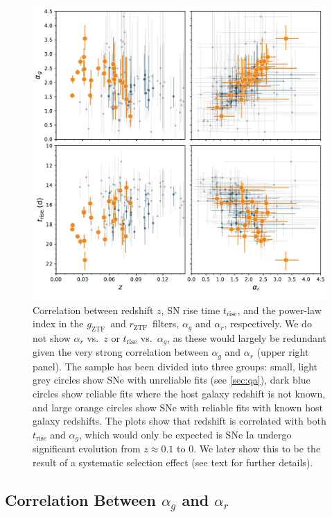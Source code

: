 \documentclass[twocolumn]{./aastex63}
\newcommand{\rztf}{$r_\mathrm{ZTF}$}
\newcommand{\gztf}{$g_\mathrm{ZTF}$}
\begin{document}
\begin{figure}
    \centering
    \includegraphics[width=6in]{./figures/param_correlations.pdf}
    \caption{Correlation between redshift $z$, SN rise time
    $t_\mathrm{rise}$, and the power-law index in the \gztf\ and \rztf\
    filters, $\alpha_g$ and $\alpha_r$, respectively. We do not show
    $\alpha_r$ vs.~$z$ or $t_\mathrm{rise}$ vs.~$\alpha_g$, as these would
    largely be redundant given the very strong correlation between $\alpha_g$
    and $\alpha_r$ (upper right panel). The sample has been divided into three
    groups: small, light grey circles show SNe with unreliable fits (see
    \ref{sec:qa}), dark blue circles show reliable fits where the host
    galaxy redshift is not known, and large orange circles show SNe with
    reliable fits with known host galaxy redshifts. The plots show that
    redshift is correlated with both $t_\mathrm{rise}$ and $\alpha_g$, which
    would only be expected is SNe Ia undergo significant evolution from $z
    \approx 0.1$ to $0$. We later show this to be the result of a systematic
    selection effect (see text for further details). }
    \label{fig:model_parameters}
\end{figure}

\subsection{Correlation Between $\alpha_g$ and $\alpha_r$}\label{sec:alpha_correlation}
\end{document}

